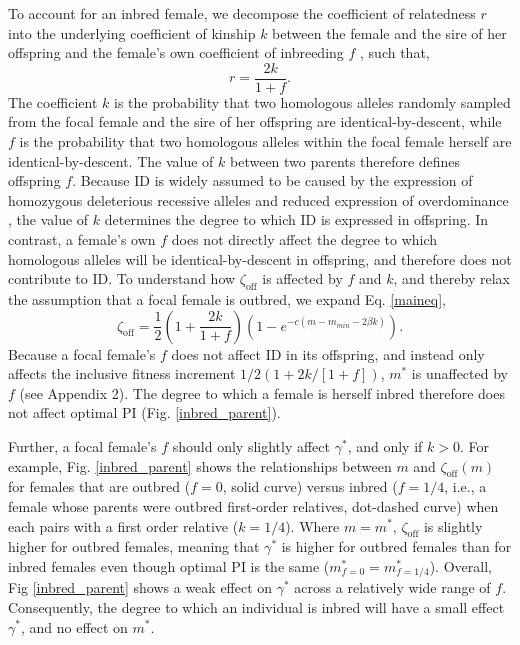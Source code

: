 \documentclass[10pt,letterpaper]{article}
\begin{document}
To account for an inbred female, we decompose the coefficient of relatedness $r$ into the underlying coefficient of kinship $k$ between the female and the sire of her offspring and the female's own coefficient of inbreeding $f$  \cite[see][]{Hamilton1972, Michod1979}, such that,
\begin{equation} \label{rdef}
r = \frac{2k}{1 + f}.
\end{equation}
The coefficient $k$ is the probability that two homologous alleles randomly sampled from the focal female and the sire of her offspring are identical-by-descent, while $f$ is the probability that two homologous alleles within the focal female herself are identical-by-descent. The value of $k$ between two parents therefore defines offspring $f$. Because ID is widely assumed to be caused by the expression of homozygous deleterious recessive alleles and reduced expression of overdominance \cite[][]{Charlesworth2009}, the value of $k$ determines the degree to which ID is expressed in offspring. In contrast, a female's own $f$ does not directly affect the degree to which homologous alleles will be identical-by-descent in offspring, and therefore does not contribute to ID. To understand how $\zeta_{\textrm{off}}$ is affected by $f$ and $k$, and thereby relax the assumption that a focal female is outbred, we expand Eq. \ref{maineq},
\begin{equation} \label{maineqr}
\zeta_{\textrm{off}} = \frac{1}{2}\left(1+\frac{2k}{1+f}\right)\left(1-e^{-c\left(m-m_{min}-2\beta k\right)}\right).
\end{equation}
Because a focal female's $f$ does not affect ID in its offspring, and instead only affects the inclusive fitness increment $1/2\left(1+ 2 k / \left[1 + f\right]\right)$, $m^{*}$ is unaffected by $f$  (see Appendix 2). The degree to which a female is herself inbred therefore does not affect optimal PI (Fig. \ref{inbred_parent}). 

Further, a focal female's $f$ should only slightly affect $\gamma^{*}$, and only if $k>0$. For example, Fig. \ref{inbred_parent} shows the relationships between $m$ and $\zeta_{\textrm{off}}(m)$ for females that are outbred ($f=0$, solid curve) versus inbred ($f=1/4$, i.e., a female whose parents were outbred first-order relatives, dot-dashed curve) when each pairs with a first order relative ($k=1/4$). Where $m=m^{*}$, $\zeta_{\textrm{off}}$ is slightly higher for outbred females, meaning that $\gamma^{*}$ is higher for outbred females than for inbred females even though optimal PI is the same ($m^{*}_{f=0}=m^{*}_{f=1/4}$). Overall, Fig \ref{inbred_parent} shows a weak effect on $\gamma^{*}$ across a relatively wide range of $f$. Consequently, the degree to which an individual is inbred will have a small effect $\gamma^{*}$, and no effect on $m^{*}$.
\end{document}

